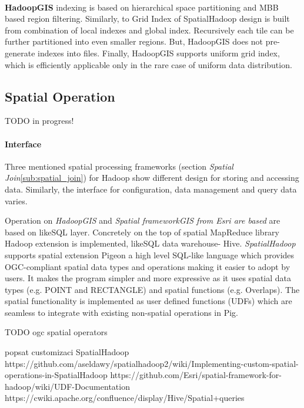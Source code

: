 \documentclass[a4paper,12pt,oneside]{report}
\begin{document}
\paragraph*{} \textbf{HadoopGIS} indexing is based on hierarchical space partitioning and MBB based 
region filtering. Similarly, to Grid Index of SpatialHadoop design is built from  combination of local 
indexes and global index. Recursively each tile can be further partitioned into even smaller regions. 
But, HadoopGIS does not pre-generate indexes into files. Finally, HadoopGIS supports uniform grid 
index, which is efficiently applicable only in the rare case of uniform data distribution. 

		\subsection{Spatial Operation}


TODO in progress!
\paragraph{Interface}Three mentioned spatial processing frameworks (section \textit{Spatial Join}\ref{sub:spatial_join}) 
for Hadoop show different design for storing and accessing data. Similarly, the interface for 
configuration, data management and query data varies.

Operation on \textit{HadoopGIS} and \textit{Spatial frameworkGIS from Esri are based} are based on likeSQL layer. 
Concretely on the top of spatial MapReduce library Hadoop extension is implemented, likeSQL data warehouse- Hive.  
\textit{SpatialHadoop} supports spatial extension Pigeon a high level SQL-like language which  provides OGC-compliant 
spatial data types and operations making it easier to adopt by users. It makes the program simpler and more expressive 
as it uses spatial data types (e.g. POINT and RECTANGLE) and spatial functions (e.g. Overlaps). 
The spatial functionality is implemented as user defined functions (UDFs) which are seamless to integrate with existing 
non-spatial operations in Pig.
		
		
		TODO
		  ogc spatial operators

		  popsat customizaci SpatialHadoop
	      https://github.com/aseldawy/spatialhadoop2/wiki/Implementing-custom-spatial-operations-in-SpatialHadoop
 		  https://github.com/Esri/spatial-framework-for-hadoop/wiki/UDF-Documentation
		  https://cwiki.apache.org/confluence/display/Hive/Spatial+queries
\end{document}
